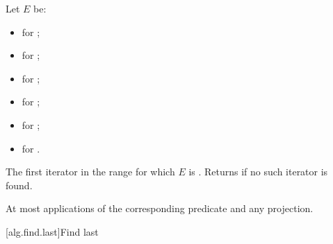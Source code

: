 \begin{itemdescr}
\pnum
Let $E$ be:
\begin{itemize}
\item {} for ;
\item {} for ;
\item {} for ;
\item {} for ;
\item {} for ;
\item {} for .
\end{itemize}

\pnum
\returns
The first iterator  in the range 
for which $E$ is .
Returns  if no such iterator is found.

\pnum
\complexity
At most  applications
of the corresponding predicate and any projection.
\end{itemdescr}

[alg.find.last]{Find last}


